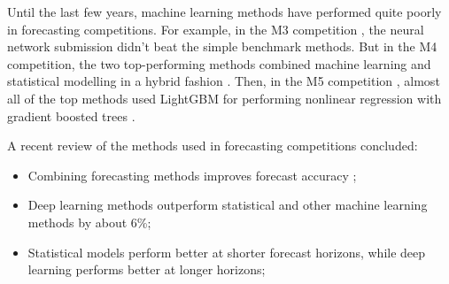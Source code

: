 \documentclass[a4paper,10pt]{article}
\begin{document}
Until the last few years, machine learning methods have performed quite poorly in forecasting competitions. For example, in the M3 competition \citep{M3comp}, the neural network submission didn't beat the simple benchmark methods. But in the M4 competition, the two top-performing methods combined machine learning and statistical modelling in a hybrid fashion \citep{M4results}. Then, in the M5 competition \citep{M5accuracy}, almost all of the top methods used LightGBM for performing nonlinear regression with gradient boosted trees \citep{lightgbm}.

A recent review of the methods used in forecasting competitions \citep{Makridakis2022} concluded:
\begin{itemize}
	\item Combining forecasting methods improves forecast accuracy \citep[see also][]{combinations};
	\item Deep learning methods outperform statistical and other machine learning methods by about 6\%;
	\item Statistical models perform better at shorter forecast horizons, while deep learning performs better at longer horizons;
\end{itemize}







\nocite{fpp3}


\end{document}
